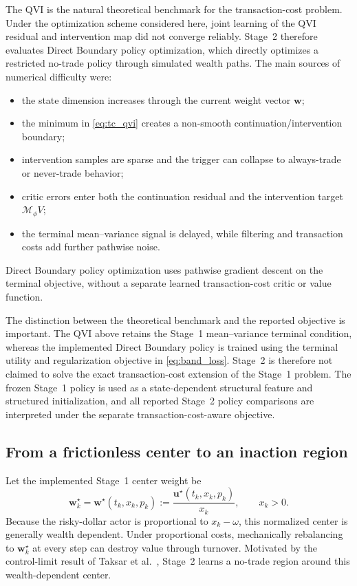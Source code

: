 \documentclass[a4paper,10pt]{article}
\newcommand{\bu}{\bm{u}}
\newcommand{\bw}{\bm{w}}
\begin{document}
The QVI is the natural theoretical benchmark for the transaction-cost
problem. Under the optimization scheme considered here, joint learning of
the QVI residual and intervention map did not converge reliably. Stage~2
therefore evaluates Direct Boundary policy optimization, which directly
optimizes a restricted no-trade policy through simulated wealth paths. The main sources of numerical difficulty were:
\begin{itemize}
\item the state dimension increases through the current weight vector $\bw$;
\item the minimum in \eqref{eq:tc_qvi} creates a non-smooth continuation/intervention boundary;
\item intervention samples are sparse and the trigger can collapse to always-trade or never-trade behavior;
\item critic errors enter both the continuation residual and the intervention target $\mathcal M_\phi V$;
\item the terminal mean--variance signal is delayed, while filtering and transaction costs add further pathwise noise.
\end{itemize}
Direct Boundary policy optimization uses pathwise gradient descent on the terminal objective, without a separate learned transaction-cost critic or value function.

The distinction between the theoretical benchmark and the reported objective is important. The QVI above retains the Stage~1 mean--variance terminal condition, whereas the implemented Direct Boundary policy is trained using the terminal utility and regularization objective in \eqref{eq:band_loss}. Stage~2 is therefore not claimed to solve the exact transaction-cost extension of the Stage~1 problem. The frozen Stage~1 policy is used as a state-dependent structural feature and structured initialization, and all reported Stage~2 policy comparisons are interpreted under the separate transaction-cost-aware objective.

\subsection{From a frictionless center to an inaction region}

Let the implemented Stage~1 center weight be
\begin{equation}
\bw_k^\star
=\bw^\star(t_k,x_k,p_k)
:=\frac{\bu^\star(t_k,x_k,p_k)}{x_k},
\qquad x_k>0.
\label{eq:wealth_dependent_center}
\end{equation}
Because the risky-dollar actor is proportional to $x_k-\omega$, this normalized center is generally wealth dependent. Under proportional costs, mechanically rebalancing to $\bw_k^\star$ at every step can destroy value through turnover. Motivated by the control-limit result of Taksar et al.~\cite{taksar1988}, Stage~2 learns a no-trade region around this wealth-dependent center.
\end{document}
